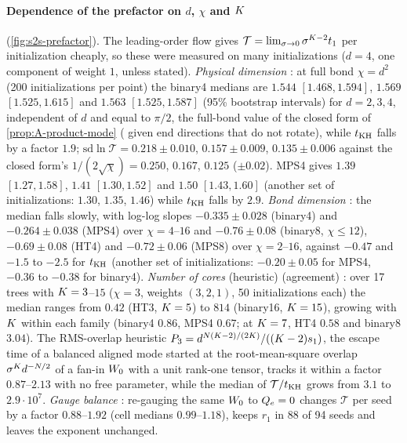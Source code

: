 \paragraph{Dependence of the prefactor on $d$, $\chi$ and $K$} (\cref{fig:s2s-prefactor}).
The leading-order flow gives $\mathcal{T}=\lim_{\sigma\to0}\sigma^{K-2}t_{1}$ per initialization cheaply, so these were measured
on many initializations ($d=4$, one component of weight $1$, unless stated). \emph{Physical dimension}
\empirical{} : at full bond $\chi=d^2$ (200 initializations per point) the binary4
medians are $1.544$ $[1.468,1.594]$, $1.569$ $[1.525,1.615]$ and $1.563$ $[1.525,1.587]$ (95\% bootstrap intervals)
for $d=2,3,4$, independent of $d$ and equal to $\pi/2$, the full-bond value of the closed form of
\cref{prop:A-product-mode} (\derived{} given end directions that do not rotate), while $t_{\rm KH}$ falls by a factor
$1.9$; $\mathrm{sd}\ln\mathcal{T}=0.218\pm0.010$, $0.157\pm0.009$, $0.135\pm0.006$ against the closed form's
$1/(2\sqrt\chi)=0.250$, $0.167$, $0.125$ ($\pm0.02$). MPS4 gives $1.39$ $[1.27,1.58]$, $1.41$ $[1.30,1.52]$ and $1.50$
$[1.43,1.60]$ (another set of initializations: $1.30$, $1.35$, $1.46$) while $t_{\rm KH}$ falls by $2.9$.
\emph{Bond dimension} \empirical{} \newresult: the median falls slowly, with log-log slopes $-0.335\pm0.028$
(binary4) and $-0.264\pm0.038$ (MPS4) over $\chi=4$--$16$ and $-0.76\pm0.08$ (binary8, $\chi\le12$), $-0.69\pm0.08$
(HT4) and $-0.72\pm0.06$ (MPS8) over $\chi=2$--$16$, against $-0.47$ and $-1.5$ to $-2.5$ for $t_{\rm KH}$ (another set
of initializations: $-0.20\pm0.05$ for MPS4, $-0.36$ to $-0.38$ for binary4). \emph{Number of cores} \conjecture{}
(heuristic) \empirical{} (agreement) \newresult: over 17 trees with $K=3$--$15$ ($\chi=3$, weights $(3,2,1)$, 50
initializations each) the median ranges from $0.42$ (HT3, $K=5$) to $814$ (binary16, $K=15$), growing with $K$
within each family (binary4 $0.86$, MPS4 $0.67$; at $K=7$, HT4 $0.58$ and binary8 $3.04$). The RMS-overlap
heuristic $P_3=d^{N(K-2)/(2K)}/((K-2)s_{1})$, the escape time of a balanced aligned mode started at the
root-mean-square overlap $\sigma^K d^{-N/2}$ of a fan-in $W_{0}$ with a unit rank-one tensor, tracks it within a
factor $0.87$--$2.13$ with no free parameter, while the median of $\mathcal{T}/t_{\rm KH}$ grows from $3.1$ to $2.9\cdot10^7$.
\emph{Gauge balance} \empirical{} \newresult[minor]: re-gauging the same $W_{0}$ to $Q_{e}=0$ changes $\mathcal{T}$ per seed by
a factor $0.88$--$1.92$ (cell medians $0.99$--$1.18$), keeps $r_1$ in 88 of 94 seeds and leaves the exponent
unchanged.

